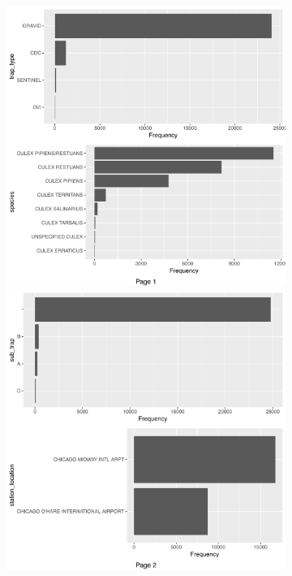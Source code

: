 \begin{figure}[htb]
	\begin{subfigure}[t]{1\textwidth}
		\begin{minipage}[t]{.475\textwidth} %
			\includegraphics[width=\textwidth]{images/ml/plot_bar1}
		\end{minipage}%
		\hfill
		\begin{minipage}[t]{.475\textwidth}
			\includegraphics[width=\textwidth]{images/ml/plot_bar2}
		\end{minipage}
	\end{subfigure}
	

\end{figure}

